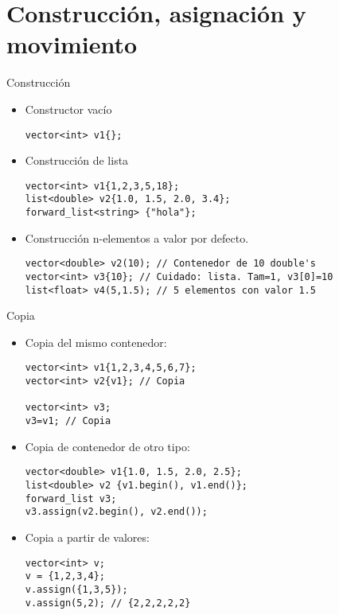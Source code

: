 \section{Construcción, asignación y movimiento}

\begin{frame}[t,fragile]{Construcción}
\begin{itemize}
  \item Constructor vacío
\begin{lstlisting}
vector<int> v1{};
\end{lstlisting}

  \item Construcción de lista
\begin{lstlisting}
vector<int> v1{1,2,3,5,18}; 
list<double> v2{1.0, 1.5, 2.0, 3.4};
forward_list<string> {"hola"};
\end{lstlisting}

  \item Construcción n-elementos a valor por defecto.
\begin{lstlisting}
vector<double> v2(10); // Contenedor de 10 double's
vector<int> v3{10}; // Cuidado: lista. Tam=1, v3[0]=10
list<float> v4(5,1.5); // 5 elementos con valor 1.5 
\end{lstlisting}
\end{itemize}
\end{frame}

\begin{frame}[t,fragile]{Copia}
\begin{itemize}
  \item Copia del mismo contenedor:
\begin{lstlisting}
vector<int> v1{1,2,3,4,5,6,7};
vector<int> v2{v1}; // Copia

vector<int> v3;
v3=v1; // Copia
\end{lstlisting}

  \item Copia de contenedor de otro tipo:
\begin{lstlisting}
vector<double> v1{1.0, 1.5, 2.0, 2.5};
list<double> v2 {v1.begin(), v1.end()};
forward_list v3;
v3.assign(v2.begin(), v2.end());
\end{lstlisting}

  \item Copia a partir de valores:
\begin{lstlisting}
vector<int> v;
v = {1,2,3,4};
v.assign({1,3,5});
v.assign(5,2); // {2,2,2,2,2}
\end{lstlisting}
\end{itemize}
\end{frame}

